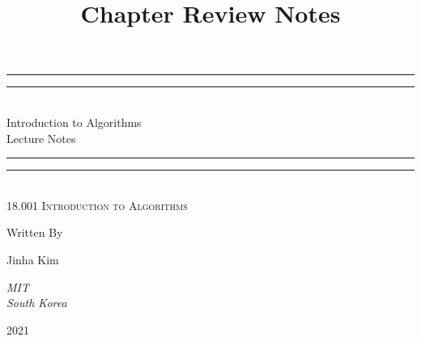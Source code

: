 \documentclass[11pt]{article}
\theoremstyle{definition}
\newlength{\drop}
\begin{document}
 

\begin{titlepage}
    \textheight
    \centering
    \vspace*{\baselineskip}
    \rule{\textwidth}{1.6pt}\vspace*{-\baselineskip}\vspace*{2pt}
    \rule{\textwidth}{0.4pt}\\[\baselineskip]
    {\LARGE Introduction to Algorithms \\ [0.3\baselineskip] Lecture Notes }\\[0.2\baselineskip] 
    \rule{\textwidth}{0.4pt}\vspace*{-\baselineskip}\vspace{3.2pt}
    \rule{\textwidth}{1.6pt}\\[\baselineskip]
    \scshape
    18.001 Introduction to Algorithms \\ \par
    \vspace*{2\baselineskip}
    Written By \\[\baselineskip]
    {\Large Jinha Kim \par}
    {\itshape MIT \\ South Korea\par}
    \vfill
    {\scshape 2021} \\ 
\end{titlepage}

\setcounter{section}{8} %
\title{Chapter Review Notes} 

%  
\end{document}
